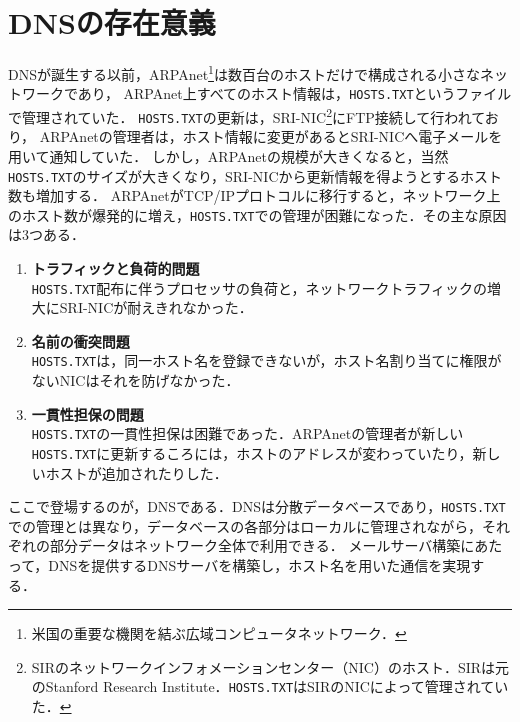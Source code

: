 \section{DNSの存在意義}
DNSが誕生する以前，ARPAnet\footnote{米国の重要な機関を結ぶ広域コンピュータネットワーク\cite[p.1]{DNSBIND}．}は数百台のホストだけで構成される小さなネットワークであり，
ARPAnet上すべてのホスト情報は，\texttt{HOSTS.TXT}というファイルで管理されていた．
\texttt{HOSTS.TXT}の更新は，SRI-NIC\footnote{SIRのネットワークインフォメーションセンター（NIC）のホスト．SIRは元のStanford Research Institute．\texttt{HOSTS.TXT}はSIRのNICによって管理されていた．}にFTP接続して行われており，
ARPAnetの管理者は，ホスト情報に変更があるとSRI-NICへ電子メールを用いて通知していた．
しかし，ARPAnetの規模が大きくなると，当然\texttt{HOSTS.TXT}のサイズが大きくなり，SRI-NICから更新情報を得ようとするホスト数も増加する\cite[p.3]{DNSBIND}．
ARPAnetがTCP/IPプロトコルに移行すると，ネットワーク上のホスト数が爆発的に増え，\texttt{HOSTS.TXT}での管理が困難になった．その主な原因は3つある．
\begin{enumerate}
      \item \textbf{トラフィックと負荷的問題}\\
            \texttt{HOSTS.TXT}配布に伴うプロセッサの負荷と，ネットワークトラフィックの増大にSRI-NICが耐えきれなかった．
      \item \textbf{名前の衝突問題}\\
            \texttt{HOSTS.TXT}は，同一ホスト名を登録できないが，ホスト名割り当てに権限がないNICはそれを防げなかった．
      \item \textbf{一貫性担保の問題}\\
            \texttt{HOSTS.TXT}の一貫性担保は困難であった．ARPAnetの管理者が新しい\texttt{HOSTS.TXT}に更新するころには，ホストのアドレスが変わっていたり，新しいホストが追加されたりした．
\end{enumerate}
\hfill\cite[p.4]{DNSBIND}\par
ここで登場するのが，DNSである．DNSは分散データベースであり，\texttt{HOSTS.TXT}での管理とは異なり，データベースの各部分はローカルに管理されながら，それぞれの部分データはネットワーク全体で利用できる\cite[p.5]{DNSBIND}．
メールサーバ構築にあたって，DNSを提供するDNSサーバを構築し，ホスト名を用いた通信を実現する．